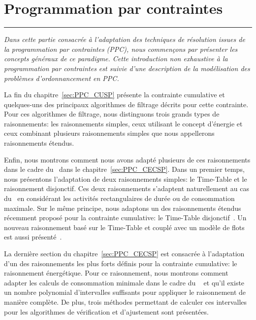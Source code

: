 

\cleardoublepage
\begin{minipage}{0.95\linewidth}
\part{Programmation par contraintes}
\label{part:PPC}
\vspace{15mm} %
\parttoc 
\end{minipage}

\newpage
\thispagestyle{empty}
\begin{center}
  \begin{minipage}{\textwidth}
    \hrule
    \vspace{0.5cm}
    {\it Dans cette partie consacrée à l'adaptation des techniques de
      résolution issues de la programmation par contraintes (PPC), nous
      commençons par présenter les concepts généraux de ce
      paradigme. Cette introduction non exhaustive à la programmation
      par contraintes est suivie d'une description de la modélisation
      des problèmes d'ordonnancement en PPC. 

      La fin du chapitre~\ref{sec:PPC_CUSP} présente la contrainte
      cumulative et quelques-uns des principaux algorithmes de filtrage décrits
      pour cette contrainte. Pour ces algorithmes de filtrage, nous
      distinguons trois grands types de raisonnements: les
      raisonnements simples, ceux utilisant le concept d'énergie et
      ceux combinant plusieurs raisonnements simples que nous
      appellerons raisonnements étendus. 
    
      Enfin, nous montrons comment nous avons adapté plusieurs de ces
      raisonnements dans le cadre du \CECSP~dans le
      chapitre~\ref{sec:PPC_CECSP}. Dans un premier temps, nous présentons
      l'adaptation de deux raisonnements simples: le Time-Table et le
      raisonnement disjonctif. Ces deux raisonnements s'adaptent 
      naturellement au cas du \CECSP~en considérant les activités
      rectangulaires de durée ou de consommation
      maximale. Sur le même principe, nous adaptons un des
      raisonnements étendus récemment proposé pour la contrainte cumulative: le 
      Time-Table disjonctif~\cite{Gay2015}. Un nouveau raisonnement
      basé sur le Time-Table et couplé avec un modèle de flots est
      aussi présenté~\cite{Nattaf_CPDP}.

      La dernière section du chapitre~\ref{sec:PPC_CECSP} est
      consacrée à l'adaptation d'un des raisonnements les plus forts définis pour la
      contrainte cumulative: le raisonnement énergétique. Pour ce
      raisonnement, nous montrons comment adapter les calculs de
      consommation minimale dans le cadre du \CECSP~ et qu'il existe
      un nombre polynomial d'intervalles suffisants pour appliquer le
      raisonnement de manière complète. De plus, trois 
      méthodes permettant de calculer ces intervalles pour les algorithmes de
      vérification et d'ajustement sont présentées. 

}
\end{minipage}
\end{center}

